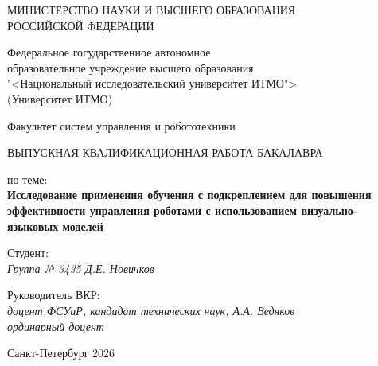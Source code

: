 \thispagestyle{empty}

\begin{center}
    МИНИСТЕРСТВО НАУКИ И ВЫСШЕГО ОБРАЗОВАНИЯ \\ РОССИЙСКОЙ ФЕДЕРАЦИИ

    \vspace{20pt}

    Федеральное государственное автономное \\ образовательное учреждение высшего образования \\
    "<Национальный исследовательский университет ИТМО"> \\
    (Университет ИТМО)

    \vspace{20pt}

    Факультет систем управления и робототехники
\end{center}

\vfill

\begin{center}
    ВЫПУСКНАЯ КВАЛИФИКАЦИОННАЯ РАБОТА БАКАЛАВРА \\

    \vspace{20pt}

    по теме: \\
    \textbf{Исследование применения обучения с подкреплением для повышения эффективности управления роботами с использованием визуально-языковых моделей}
\end{center}

\vfill

    \noindent Студент: \\
    \textit{Группа № 3435 \hfill Д.Е. Новичков}

    \vspace{20pt}

    \noindent Руководитель ВКР: \\
    \textit{доцент ФСУиР, кандидат технических наук, \hfill А.А. Ведяков} \\
    \textit{ординарный доцент}

\vfill

\begin{center}
    Санкт-Петербург 2026
\end{center}
